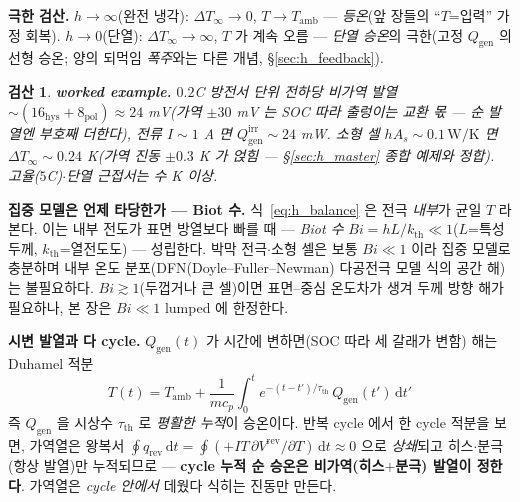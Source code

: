 \documentclass[11pt,a4paper]{article}
\newtheorem*{verifybox}{검산}
\newcommand{\dd}{\mathrm{d}}
\newcommand{\hys}{\mathrm{hys}}
\newcommand{\pol}{\mathrm{pol}}
\newcommand{\rev}{\mathrm{rev}}
\newcommand{\irr}{\mathrm{irr}}
\newcommand{\gen}{\mathrm{gen}}
\newcommand{\amb}{\mathrm{amb}}
\newcommand{\Th}{\mathrm{th}}
\begin{document}
\textbf{극한 검산.} $h\to\infty$(완전 냉각): $\Delta T_\infty\to0$, $T\to T_\amb$ — \emph{등온}(앞 장들의
``$T$=입력'' 가정 회복). $h\to0$(단열): $\Delta T_\infty\to\infty$, $T$ 가 계속 오름 — \emph{단열 승온}의 극한(고정 $Q_\gen$ 의 선형 승온;
양의 되먹임 \emph{폭주}와는 다른 개념, \S\ref{sec:h_feedback}).
\begin{verifybox}
\textbf{worked example.} $0.2$C 방전서 단위 전하당 \emph{비가역} 발열 $\sim(16_\hys+8_\pol)\approx24$ mV(가역
$\pm30$ mV 는 SOC 따라 출렁이는 \emph{교환} 몫 — 순 발열엔 부호째 더한다), 전류 $I\sim1$ A 면 $Q_\gen^\irr\sim24$ mW.
소형 셀 $hA_s\sim0.1\,\mathrm{W/K}$ 면 $\Delta T_\infty\sim0.24$ K(가역 진동 $\pm0.3$ K 가 얹힘 — \S\ref{sec:h_master}
종합 예제와 정합). 고율($5$C)$\cdot$단열 근접서는 수 K 이상.
\end{verifybox}

\textbf{집중 모델은 언제 타당한가 — Biot 수.} 식~\eqref{eq:h_balance} 은 전극 \emph{내부}가 균일 $T$ 라 본다.
이는 내부 전도가 표면 방열보다 빠를 때 — \emph{Biot 수} $Bi=hL/k_\Th\ll1$($L$=특성 두께, $k_\Th$=열전도도) —
성립한다. 박막 전극$\cdot$소형 셀은 보통 $Bi\ll1$ 이라 집중 모델로 충분하며 내부 온도 분포(DFN(Doyle--Fuller--Newman) 다공전극 모델 식의 공간 해)는
불필요하다. $Bi\gtrsim1$(두껍거나 큰 셀)이면 표면--중심 온도차가 생겨 두께 방향 해가 필요하나, 본 장은 $Bi\ll1$
lumped 에 한정한다.

\textbf{시변 발열과 다 cycle.} $Q_\gen(t)$ 가 시간에 변하면(SOC 따라 세 갈래가 변함) 해는 Duhamel 적분
\begin{equation}
T(t)=T_\amb+\frac{1}{mc_p}\int_0^t e^{-(t-t')/\tau_\Th}\,Q_\gen(t')\,\dd t'
\label{eq:h_duhamel}
\end{equation}
즉 $Q_\gen$ 을 시상수 $\tau_\Th$ 로 \emph{평활한 누적}이 승온이다. 반복 cycle 에서 한 cycle 적분을 보면, 가역열은
왕복서 $\oint q_\rev\,\dd t=\oint(+IT\,\partial V^\rev/\partial T)\,\dd t\approx0$ 으로 \emph{상쇄}되고 히스$\cdot$분극(항상 발열)만 누적되므로
— \textbf{cycle 누적 순 승온은 비가역(히스$+$분극) 발열이 정한다}. 가역열은 \emph{cycle 안에서} 데웠다 식히는
진동만 만든다.

\end{document}
